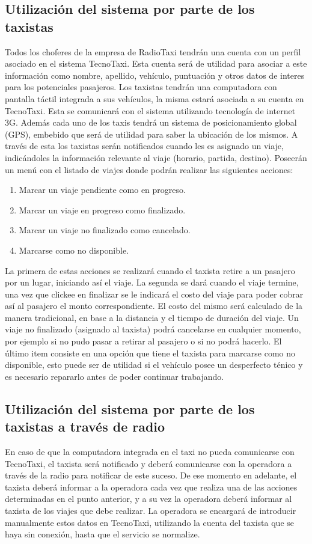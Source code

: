 \subsection{Utilización del sistema por parte de los taxistas}
Todos los choferes de la empresa de RadioTaxi tendrán una cuenta con un perfil asociado en el sistema TecnoTaxi. Esta cuenta será de utilidad para asociar a este información como nombre, apellido, vehículo, puntuación y otros datos de interes para los potenciales pasajeros. Los taxistas tendrán una computadora con pantalla táctil integrada a sus vehículos, la misma estará asociada a su cuenta en TecnoTaxi. Esta se comunicará con el sistema utilizando tecnología de internet 3G. Además cada uno de los taxis tendrá un sistema de posicionamiento global (GPS), embebido que será de utilidad para saber la ubicación de los mismos. A través de esta los taxistas serán notificados cuando les es asignado un viaje, indicándoles la información relevante al viaje (horario, partida, destino). Poseerán un menú con el listado de viajes donde podrán realizar las siguientes acciones:
\begin{enumerate}
\item Marcar un viaje pendiente como en progreso.
\item Marcar un viaje en progreso como finalizado.
\item Marcar un viaje no finalizado como cancelado.
\item Marcarse como no disponible.
\end{enumerate}
La primera de estas acciones se realizará cuando el taxista retire a un pasajero por un lugar, iniciando así el viaje. La segunda se dará cuando el viaje termine, una vez que clickee en finalizar se le indicará el costo del viaje para poder cobrar así al pasajero el monto correspondiente. El costo del mismo será calculado de la manera tradicional, en base a la distancia y el tiempo de duración del viaje. Un viaje no finalizado (asignado al taxista) podrá cancelarse en cualquier momento, por ejemplo si no pudo pasar a retirar al pasajero o si no podrá hacerlo. El último item consiste en una opción que tiene el taxista para marcarse como no disponible, esto puede ser de utilidad si el vehículo posee un desperfecto ténico y es necesario repararlo antes de poder continuar trabajando.

\subsection{Utilización del sistema por parte de los taxistas a través de radio}
En caso de que la computadora integrada en el taxi no pueda comunicarse con TecnoTaxi, el taxista será notificado y deberá comunicarse con la operadora a través de la radio para notificar de este suceso. De ese momento en adelante, el taxista deberá informar a la operadora cada vez que realiza una de las acciones determinadas en el punto anterior, y a su vez la operadora deberá informar al taxista de los viajes que debe realizar. La operadora se encargará de introducir manualmente estos datos en TecnoTaxi, utilizando la cuenta del taxista que se haya sin conexión, hasta que el servicio se normalize.

